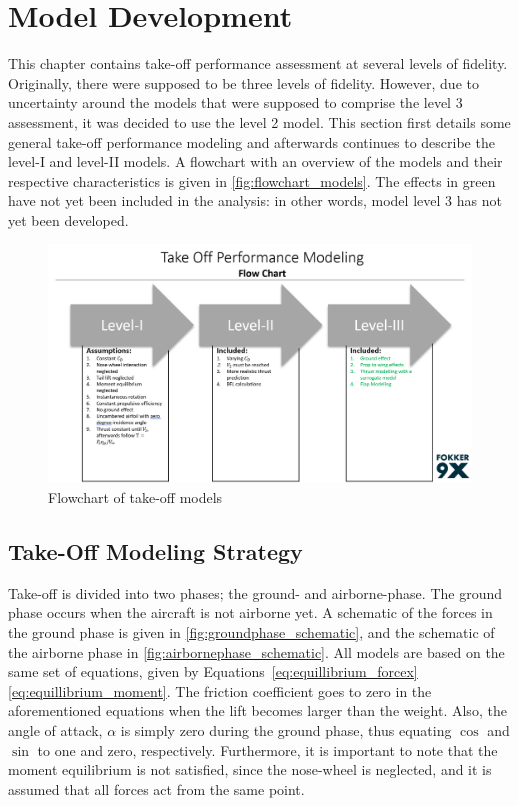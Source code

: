 \chapter{Model Development}\label{chapter:model_development}
This chapter contains take-off performance assessment at several levels of fidelity. Originally, there were supposed to be three levels of fidelity. However, due to uncertainty around the models that were supposed to comprise the level 3 assessment, it was decided to use the level 2 model. This section first details some general take-off performance modeling and afterwards continues to describe the level-I and level-II models. A flowchart with an overview of the models and their respective characteristics is given in \autoref{fig:flowchart_models}. The effects in green have not yet been included in the analysis: in other words, model level 3 has not yet been developed.

\begin{figure}[!ht]
    \centering
    \includegraphics[width=\linewidth]{figures/program_flowchart.png}
    \caption{Flowchart of take-off models}
    \label{fig:flowchart_models}
\end{figure}

\section{Take-Off Modeling Strategy}\label{sec:generalTO}
Take-off is divided into two phases; the ground- and airborne-phase. The ground phase occurs when the aircraft is not airborne yet. A schematic of the forces in the ground phase is given in \autoref{fig:groundphase_schematic}, and the schematic of the airborne phase in \autoref{fig:airbornephase_schematic}. All models are based on the same set of equations, given by Equations~\eqref{eq:equillibrium_forcex} \textemdash\;\eqref{eq:equillibrium_moment}. The friction coefficient goes to zero in the aforementioned equations when the lift becomes larger than the weight. Also, the angle of attack, $\alpha$ is simply zero during the ground phase, thus equating $\cos$ and $\sin$ to one and zero, respectively. Furthermore, it is important to note that the moment equilibrium is not satisfied, since the nose-wheel is neglected, and it is assumed that all forces act from the same point.

